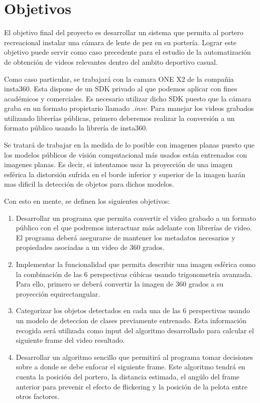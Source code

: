 \section[Objetivos]{Objetivos}
El objetivo final del proyecto es desarrollar un sistema que permita al portero recreacional instalar una cámara de lente de pez en su portería. Lograr este objetivo puede servir como caso precedente para el estudio de la automatización de obtención de videos relevantes dentro del ambito deportivo casual.

Como caso particular, se trabajará con la camara ONE X2 de la compañia insta360. Esta dispone de un SDK privado al que podemos aplicar con fines académicos y comerciales. Es necesario utilizar dicho SDK puesto que la cámara graba en un formato propietario llamado \textit{.insv}. Para manejar los videos grabados utilizando librerías públicas, primero deberemos realizar la conversión a un formato público usando la librería de insta360.

Se tratará de trabajar en la medida de lo posible con imagenes planas puesto que los modelos públicos de visión computacional más usados están entrenados con imagenes planas. Es decir, si intentamos usar la proyección de una imagen esférica la distorsión sufrida en el borde inferior y superior de la imagen harán mas dificil la detección de objetos para dichos modelos.

Con esto en mente, se definen los siguientes objetivos:

\begin{enumerate}
	\item Desarrollar un programa que permita convertir el video grabado a un formato público con el que podremos interactuar más adelante con librerías de video. El programa deberá asegurarse de mantener los metadatos necesarios y propiedades asociadas a un video de 360 grados.

	\item Implementar la funcionalidad que permita describir una imagen esférica como la combinación de las 6 perspectivas cúbicas usando trigonometría avanzada. Para ello, primero se deberá convertir la imagen de 360 grados a su proyección equirectangular.
	\item Categorizar los objetos detectados en cada una de las 6 perspectivas usando un modelo de deteccíon de clases previamente entrenado. Esta información recogida será utilizada como input del algoritmo desarrollado para calcular el siguiente frame del video resultado.
	
	\item Desarrollar un algoritmo sencillo que permitirá al programa tomar decisiones sobre a donde se debe enfocar el siguiente frame. Este algoritmo tendrá en cuenta la posición del portero, la distancia estimada, el angúlo del frame anterior para prevenir el efecto de flickering y la posición de la pelota entre otros factores.
		
	  
\end{enumerate}

